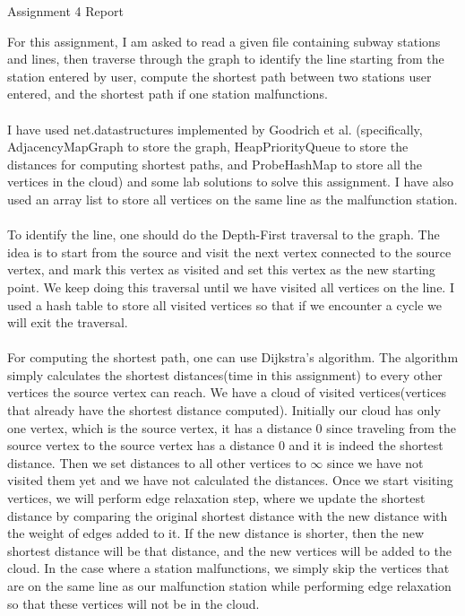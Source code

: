 \documentclass[11pt]{article}
\begin{document}
\begin{center}
\begin{Large}
Assignment 4 Report
\end{Large}
\end{center}
For this assignment, I am asked to read a given file containing subway stations and lines, then traverse through the graph to identify the line starting from the station entered by user, compute the shortest path between two stations user entered, and the shortest path if one station malfunctions.\\
\\
I have used net.datastructures implemented by Goodrich et al. (specifically, AdjacencyMapGraph to store the graph, HeapPriorityQueue to store the distances for computing shortest paths, and ProbeHashMap to store all the vertices in the cloud) and some lab solutions to solve this assignment. I have also used an array list to store all vertices on the same line as the malfunction station.\\
\\
To identify the line, one should do the Depth-First traversal to the graph. The idea is to start from the source and visit the next vertex connected to the source vertex, and mark this vertex as visited and set this vertex as the new starting point. We keep doing this traversal until we have visited all vertices on the line. I used a hash table to store all visited vertices so that if we encounter a cycle we will exit the traversal.\\
\\
For computing the shortest path, one can use Dijkstra's algorithm. The algorithm simply calculates the shortest distances(time in this assignment) to every other vertices the source vertex can reach. We have a cloud of visited vertices(vertices that already have the shortest distance computed). Initially our cloud has only one vertex, which is the source vertex, it has a distance 0 since traveling from the source vertex to the source vertex has a distance 0 and it is indeed the shortest distance. Then we set distances to all other vertices to $\infty$ since we have not visited them yet and we have not calculated the distances. Once we start visiting vertices, we will perform edge relaxation step, where we update the shortest distance by comparing the original shortest distance with the new distance with the weight of edges added to it. If the new distance is shorter, then the new shortest distance will be that distance, and the new vertices will be added to the cloud. In the case where a station malfunctions, we simply skip the vertices that are on the same line as our malfunction station while performing edge relaxation so that these vertices will not be in the cloud. \\
\end{document}
